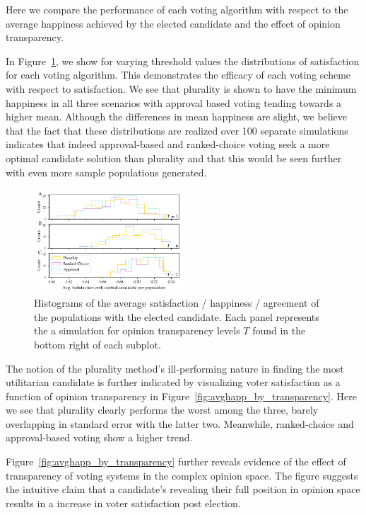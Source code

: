 Here we compare the performance of each voting algorithm with respect to the average happiness achieved by the elected candidate and
the effect of opinion transparency. \par
In Figure~\ref{fig:satisfaction_hists}, we show for varying threshold values the distributions of satisfaction for each
voting algorithm. This demonstrates the efficacy of each voting scheme with respect to satisfaction.
We see that plurality is shown to have the minimum happiness in all three scenarios with approval based voting tending towards a higher mean.
Although the differences in mean happiness are slight, we believe that the fact that these distributions are realized over
100 separate simulations indicates that indeed approval-based and ranked-choice voting seek a more optimal candidate solution
than plurality and that this would be seen further with even more sample populations generated.
\begin{figure}[h!]
\includegraphics[width=0.5\textwidth]{../src/figs/new/satisfaction-hist_avgperpop.pdf}
\caption{Histograms of the average satisfaction / happiness / agreement of the populations with the elected
candidate. Each panel represents the a simulation for opinion transparency levels $T$ found in the bottom right of each subplot.}
\label{fig:satisfaction_hists}
\end{figure}

The notion of the plurality method's ill-performing nature in finding the most utilitarian candidate is further indicated by visualizing voter satisfaction as a function of opinion transparency in Figure~\ref{fig:avghapp_by_transparency}.
Here we see that plurality clearly performs the worst among the three, barely overlapping in standard error with the latter two.
Meanwhile, ranked-choice and approval-based voting show a higher trend.

Figure~\ref{fig:avghapp_by_transparency} further reveals evidence of the effect of transparency of voting systems in the complex opinion space.
The figure suggests the intuitive claim that a candidate's revealing their full position in opinion space results in a increase in voter satisfaction post election.

